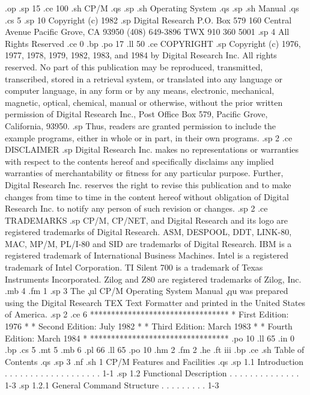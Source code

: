 .op
.sp 15
.ce 100
.sh
CP/M
.qs
.sp
.sh
Operating System
.qs
.sp
.sh
Manual
.qs
.cs 5
.sp 10
Copyright (c) 1982
.sp
Digital Research
P.O. Box 579
160 Central Avenue
Pacific Grove, CA 93950
(408) 649-3896
TWX 910 360 5001
.sp 4
All Rights Reserved
.ce 0
.bp
.po 17
.ll 50
.ce
COPYRIGHT
.sp
Copyright (c) 1976, 1977, 1978, 1979, 1982, 1983, and 1984 by 
Digital Research Inc.  All rights reserved.  No part of this 
publication may be reproduced, transmitted, transcribed, stored 
in a retrieval system, or translated into any language or 
computer language, in any form or by any means, electronic, mechanical,
magnetic, optical, chemical, manual or otherwise, without the prior
written permission of Digital Research Inc., Post Office Box 579, 
Pacific Grove, California, 93950.
.sp
Thus, readers are granted permission to include the example 
programs, either in whole or in part, in their own programs.
.sp 2
.ce
DISCLAIMER
.sp
Digital Research Inc. makes no representations or warranties with
respect to the contents hereof and specifically disclaims
any implied warranties of merchantability or fitness for
any particular purpose.  Further, Digital Research Inc. reserves the
right to revise this publication and to make changes from
time to time in the content hereof without obligation of
Digital Research Inc. to notify any person of such revision or
changes.
.sp 2
.ce
TRADEMARKS
.sp
CP/M, CP/NET, and Digital Research and its logo are registered 
trademarks of Digital Research.  ASM, DESPOOL, DDT, LINK-80, MAC, 
MP/M, PL/I-80 and SID are trademarks of Digital Research.  IBM is 
a registered trademark of International Business Machines.  Intel 
is a registered trademark of Intel Corporation.  TI Silent 700 is 
a trademark of Texas Instruments Incorporated.  Zilog and Z80 are
registered trademarks of Zilog, Inc.
.mb 4
.fm 1
.sp 3
The \c
.ul
CP/M Operating System Manual \c
.qu
was prepared using the Digital Research TEX Text Formatter and printed
in the United States of America.
.sp 2
.ce 6
*********************************
*   First Edition:  1976        *
*  Second Edition:  July 1982   *
*   Third Edition:  March 1983  *
*  Fourth Edition:  March 1984  *
*********************************
.po 10
.ll 65
.in 0
.bp
.cs 5
.mt 5
.mb 6
.pl 66
.ll 65
.po 10
.hm 2
.fm 2
.he
.ft                                iii
.bp
.ce
.sh
Table of Contents
.qs
.sp 3
.nf
.sh
1  CP/M Features and Facilities
.qs
.sp
   1.1  Introduction  . . . . . . . . . . . . . . . . . . .   1-1
.sp
   1.2  Functional Description  . . . . . . . . . . . . . .   1-3
.sp
        1.2.1  General Command Structure  . . . . . . . . .   1-3
